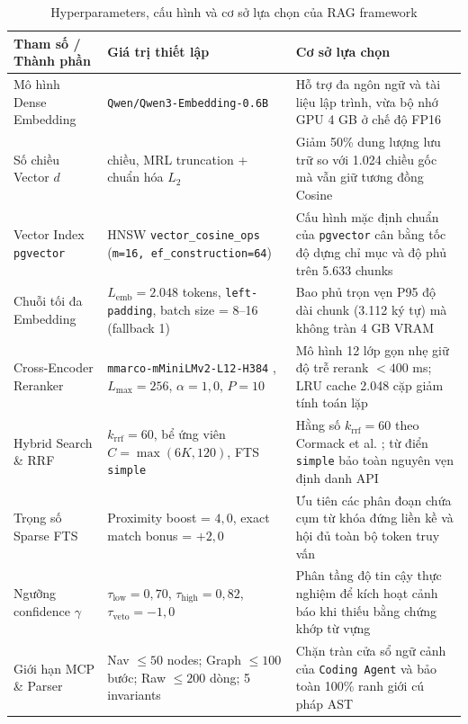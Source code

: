 \begin{table}[H]
\centering
\caption{Hyperparameters, cấu hình và cơ sở lựa chọn của RAG framework}
\label{tab:hyperparams}
\footnotesize\setlength{\tabcolsep}{4pt}\begin{tabularx}{\textwidth}{>{\raggedright\arraybackslash}p{3.2cm}>{\raggedright\arraybackslash}p{4.6cm}>{\raggedright\arraybackslash}X}
\toprule
\textbf{Tham số / Thành phần} & \textbf{Giá trị thiết lập} & \textbf{Cơ sở lựa chọn} \\
\midrule
Mô hình Dense Embedding & \texttt{Qwen/Qwen3-Embedding-0.6B} \cite{zhang2025qwen3} & Hỗ trợ đa ngôn ngữ và tài liệu lập trình, vừa bộ nhớ GPU 4 GB ở chế độ FP16 \\
\addlinespace[2pt]
Số chiều Vector $d$ & 512 chiều, MRL truncation \cite{kusupati2022mrl} + chuẩn hóa $L_2$ & Giảm 50\% dung lượng lưu trữ so với 1.024 chiều gốc mà vẫn giữ tương đồng Cosine \\
\addlinespace[2pt]
Vector Index \texttt{pgvector} & HNSW \texttt{vector\_cosine\_ops} (\texttt{m=16, ef\_construction=64}) & Cấu hình mặc định chuẩn của \texttt{pgvector} cân bằng tốc độ dựng chỉ mục và độ phủ trên 5.633 chunks \\
\addlinespace[2pt]
Chuỗi tối đa Embedding & $L_{\text{emb}} = 2.048$ tokens, \texttt{left-padding}, batch size = 8--16 (fallback 1) & Bao phủ trọn vẹn P95 độ dài chunk (3.112 ký tự) mà không tràn 4 GB VRAM \\
\addlinespace[2pt]
Cross-Encoder Reranker & \texttt{mmarco-mMiniLMv2-L12-H384} \cite{wang2021minilm}, $L_{\max}=256$, $\alpha=1,0$, $P=10$ & Mô hình 12 lớp gọn nhẹ giữ độ trễ rerank $< 400$ ms; LRU cache 2.048 cặp giảm tính toán lặp \\
\addlinespace[2pt]
Hybrid Search \& RRF & $k_{\text{rrf}} = 60$, bể ứng viên $C = \max(6K, 120)$, FTS \texttt{simple} & Hằng số $k_{\text{rrf}}=60$ theo Cormack et al. \cite{cormack2009rrf}; từ điển \texttt{simple} bảo toàn nguyên vẹn định danh API \\
\addlinespace[2pt]
Trọng số Sparse FTS & Proximity boost = $4,0$, exact match bonus = $+2,0$ & Ưu tiên các phân đoạn chứa cụm từ khóa đứng liền kề và hội đủ toàn bộ token truy vấn \\
\addlinespace[2pt]
Ngưỡng confidence $\gamma$ & $\tau_{\text{low}} = 0,70$, $\tau_{\text{high}} = 0,82$, $\tau_{\text{veto}} = -1,0$ & Phân tầng độ tin cậy thực nghiệm để kích hoạt cảnh báo khi thiếu bằng chứng khớp từ vựng \\
\addlinespace[2pt]
Giới hạn MCP \& Parser & Nav $\le 50$ nodes; Graph $\le 100$ bước; Raw $\le 200$ dòng; 5 invariants & Chặn tràn cửa sổ ngữ cảnh của \texttt{Coding Agent} và bảo toàn 100\% ranh giới cú pháp AST \\
\bottomrule
\end{tabularx}
\end{table}

